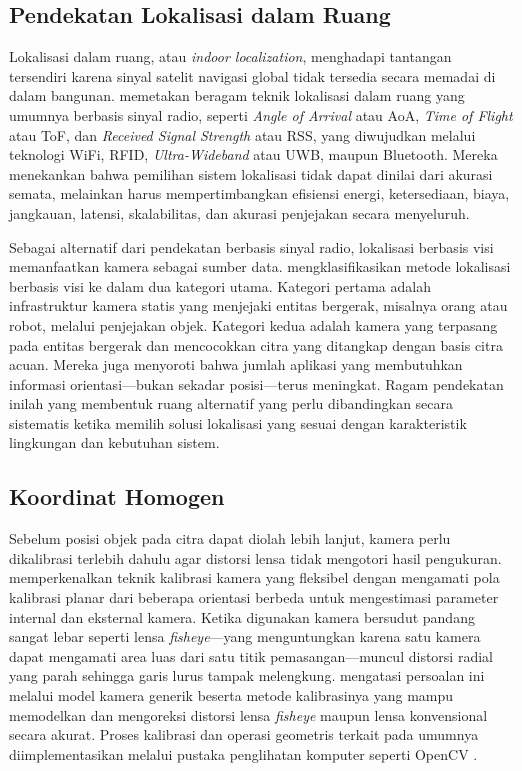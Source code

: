 \subsection{Pendekatan Lokalisasi dalam Ruang}

Lokalisasi dalam ruang, atau \textit{indoor localization}, menghadapi tantangan tersendiri karena sinyal satelit navigasi global tidak tersedia secara memadai di dalam bangunan. \textcite{zafari2019} memetakan beragam teknik lokalisasi dalam ruang yang umumnya berbasis sinyal radio, seperti \textit{Angle of Arrival} atau AoA, \textit{Time of Flight} atau ToF, dan \textit{Received Signal Strength} atau RSS, yang diwujudkan melalui teknologi WiFi, RFID, \textit{Ultra-Wideband} atau UWB, maupun Bluetooth. Mereka menekankan bahwa pemilihan sistem lokalisasi tidak dapat dinilai dari akurasi semata, melainkan harus mempertimbangkan efisiensi energi, ketersediaan, biaya, jangkauan, latensi, skalabilitas, dan akurasi penjejakan secara menyeluruh.

Sebagai alternatif dari pendekatan berbasis sinyal radio, lokalisasi berbasis visi memanfaatkan kamera sebagai sumber data. \textcite{morar2020} mengklasifikasikan metode lokalisasi berbasis visi ke dalam dua kategori utama. Kategori pertama adalah infrastruktur kamera statis yang menjejaki entitas bergerak, misalnya orang atau robot, melalui penjejakan objek. Kategori kedua adalah kamera yang terpasang pada entitas bergerak dan mencocokkan citra yang ditangkap dengan basis citra acuan. Mereka juga menyoroti bahwa jumlah aplikasi yang membutuhkan informasi orientasi---bukan sekadar posisi---terus meningkat. Ragam pendekatan inilah yang membentuk ruang alternatif yang perlu dibandingkan secara sistematis ketika memilih solusi lokalisasi yang sesuai dengan karakteristik lingkungan dan kebutuhan sistem.

\subsection{Koordinat Homogen}

Sebelum posisi objek pada citra dapat diolah lebih lanjut, kamera perlu dikalibrasi terlebih dahulu agar distorsi lensa tidak mengotori hasil pengukuran. \textcite{zhang2000} memperkenalkan teknik kalibrasi kamera yang fleksibel dengan mengamati pola kalibrasi planar dari beberapa orientasi berbeda untuk mengestimasi parameter internal dan eksternal kamera. Ketika digunakan kamera bersudut pandang sangat lebar seperti lensa \textit{fisheye}---yang menguntungkan karena satu kamera dapat mengamati area luas dari satu titik pemasangan---muncul distorsi radial yang parah sehingga garis lurus tampak melengkung. \textcite{kannala2006} mengatasi persoalan ini melalui model kamera generik beserta metode kalibrasinya yang mampu memodelkan dan mengoreksi distorsi lensa \textit{fisheye} maupun lensa konvensional secara akurat. Proses kalibrasi dan operasi geometris terkait pada umumnya diimplementasikan melalui pustaka penglihatan komputer seperti OpenCV \autocite{bradski2000}.

